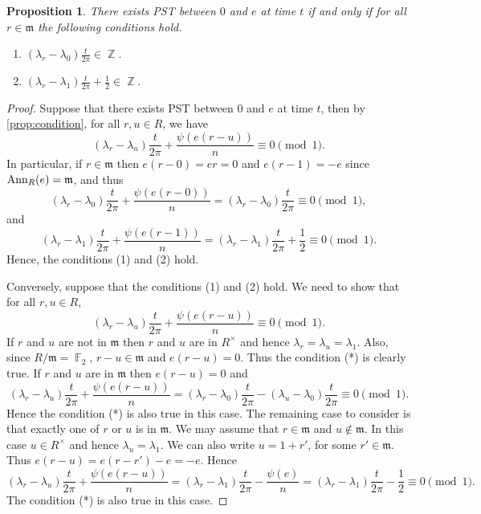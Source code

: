 \documentclass[12pt, a4paper]{amsart}
\newtheorem{prop}[thm]{Proposition}
\theoremstyle{definition}
\DeclareMathOperator{\Z}{\mathbb{Z}}
\DeclareMathOperator{\F}{\mathbb{F}}
\newcommand{\Ann}{{\rm Ann}}
\numberwithin{equation}{section}
\begin{document}
\begin{prop} \label{prop:simplified_condition}
    There exists PST between $0$ and $e$ at time $t$ if and only if for all $r \in \mathfrak{m}$ the following conditions hold. 
    \begin{enumerate}
        \item $(\lambda_r - \lambda_0) \frac{t}{2 \pi} \in \Z$. 
        \item $(\lambda_r - \lambda_1) \frac{t}{2 \pi} + \frac{1}{2}  \in \Z.$
    \end{enumerate}
\end{prop}
\begin{proof}
 Suppose that there exists PST between $0$ and $e$ at time $t$, then by \cref{prop:condition}, for all $r,u\in R$, we have 
 \[ (\lambda_{r}-\lambda_{u}) \frac{t}{2 \pi} + \frac{\psi(e(r-u))}{n} \equiv 0 \pmod{1}.\]
In particular, if $r\in \mathfrak{m}$ then $e(r-0)=er=0$ and $e(r-1)=-e$ since $\Ann_{R}(e)=\mathfrak{m}$, and thus
\[(\lambda_{r}-\lambda_{0}) \frac{t}{2 \pi} + \frac{\psi(e(r-0))}{n}=(\lambda_{r}-\lambda_{0}) \frac{t}{2 \pi}\equiv 0 \pmod{1},\]
and 
\[
(\lambda_{r}-\lambda_{1}) \frac{t}{2 \pi} + \frac{\psi(e(r-1))}{n}=(\lambda_{r}-\lambda_{1}) \frac{t}{2 \pi}+\dfrac{1}{2} \equiv 0 \pmod{1}.
\]
Hence, the conditions (1) and (2) hold.

Conversely, suppose that the conditions (1) and (2) hold. We need to show that for all $r,u\in R$, 
 \[ (\lambda_{r}-\lambda_{u}) \frac{t}{2 \pi} + \frac{\psi(e(r-u))}{n} \equiv 0 \pmod{1}.\tag{*}\]
If $r$ and $u$ are not in $\mathfrak{m}$ then $r$ and $u$ are in $R^\times$ and hence $\lambda_r=\lambda_u=\lambda_1$. Also, since $R/\mathfrak{m}=\F_2$, $r-u\in \mathfrak{m}$ and $e(r-u)=0$. Thus the condition (*) is clearly true.
If $r$ and $u$ are in  $\mathfrak{m}$ then $e(r-u)=0$ and
\[
(\lambda_{r}-\lambda_{u}) \frac{t}{2 \pi} + \frac{\psi(e(r-u))}{n}=(\lambda_{r}-\lambda_{0}) \frac{t}{2 \pi} -(\lambda_{u}-\lambda_{0}) \frac{t}{2 \pi}  \equiv 0\pmod{1}.
\]
Hence the condition (*) is also true in this case.
The remaining case to consider is that exactly one of $r$ or $u$ is in $\mathfrak{m}$. We may assume that $r\in \mathfrak{m}$ and $u\not\in\mathfrak{m}$. In this case $u\in R^\times$ and hence $\lambda_u=\lambda_1$. We can also write $u=1+r'$, for some $r'\in \mathfrak{m}$. Thus $e(r-u)=e(r-r')-e=-e$. Hence 
\[
(\lambda_{r}-\lambda_{u}) \frac{t}{2 \pi} + \frac{\psi(e(r-u))}{n} =(\lambda_{r}-\lambda_{1}) \frac{t}{2 \pi} - \frac{\psi(e)}{n}=(\lambda_{r}-\lambda_{1}) \frac{t}{2 \pi}-\dfrac{1}{2}\equiv 0\pmod{1}.
\]
 The condition (*) is also true in this case.
\end{proof}
\end{document}

